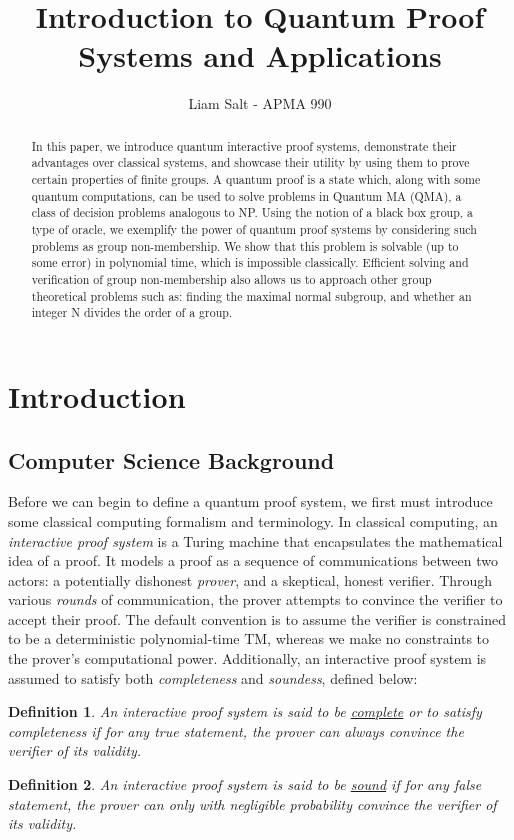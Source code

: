 \documentclass[12pt]{article}
\title{Introduction to Quantum Proof Systems and Applications}
\author{Liam Salt - APMA 990}
\newtheorem*{defn}{Definition}
\begin{document}
	\maketitle
	\tableofcontents
	\begin{abstract}
		In this paper, we introduce quantum interactive proof systems, demonstrate their advantages over classical systems, and showcase their utility by using them to prove certain properties of finite groups. A quantum proof is a state which, along with some quantum computations, can be used to solve problems in Quantum MA (QMA),  a class of decision problems analogous to NP. Using the notion of a black box group, a type of oracle, we exemplify the power of quantum proof systems by considering such problems as group non-membership. We show that this problem is solvable (up to some error) in polynomial time, which is impossible classically. Efficient solving and verification of group non-membership also allows us to approach other group theoretical problems such as: finding the maximal normal subgroup, and whether an integer N divides the order of a group.
	\end{abstract}
	\section{Introduction}
	
	\subsection{Computer Science Background}
	
	Before we can begin to define a quantum proof system, we first must introduce some classical computing formalism and terminology. In classical computing, an \textit{interactive proof system} is a Turing machine that encapsulates the mathematical idea of a proof. It models a proof as a sequence of communications between two actors: a potentially dishonest \textit{prover}, and a skeptical, honest verifier. Through various \textit{rounds} of communication, the prover attempts to convince the verifier to accept their proof. The default convention is to assume the verifier is constrained to be a deterministic polynomial-time TM, whereas we make no constraints to the prover's computational power. Additionally, an interactive proof system is assumed to satisfy both \textit{completeness} and \textit{soundess}, defined below:
	\begin{defn}
		An interactive proof system is said to be \underline{complete} or to satisfy completeness if for any true statement, the prover can always convince the verifier of its validity.
	\end{defn}
	\begin{defn} An interactive proof system is said to be \underline{sound} if for any false statement, the prover can only with negligible probability convince the verifier of its validity.
	\end{defn}
\end{document}
